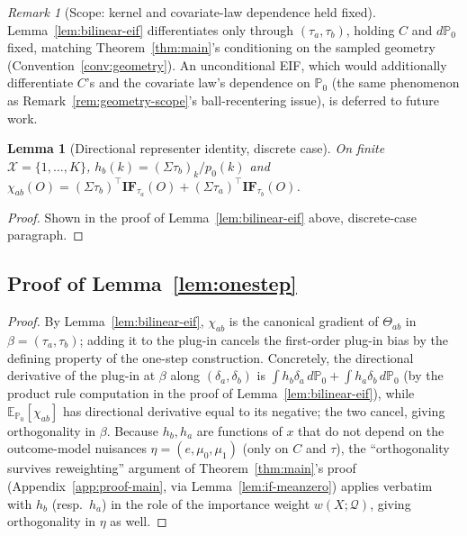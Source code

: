 \documentclass[11pt]{article}
\theoremstyle{plain}
\newtheorem{lemma}[theorem]{Lemma}
\theoremstyle{definition}
\theoremstyle{remark}
\newtheorem{remark}[theorem]{Remark}
\newcommand{\E}{\mathbb{E}}
\newcommand{\PP}{\mathbb{P}}
\newcommand{\cX}{\mathcal{X}}
\newcommand{\Q}{\mathcal{Q}}
\begin{document}
\begin{remark}[Scope: kernel and covariate-law dependence held fixed]\label{rem:kernel-dependence}
Lemma~\ref{lem:bilinear-eif} differentiates only through $(\tau_a,\tau_b)$, holding
$C$ and $d\PP_0$ fixed, matching Theorem~\ref{thm:main}'s conditioning on the sampled
geometry (Convention~\ref{conv:geometry}). An unconditional EIF, which would
additionally differentiate $C$'s and the covariate law's dependence on $\PP_0$ (the
same phenomenon as Remark~\ref{rem:geometry-scope}'s ball-recentering issue), is
deferred to future work.
\end{remark}

\begin{lemma}[Directional representer identity, discrete case]\label{lem:recovery-chi}
On finite $\cX=\{1,\dots,K\}$, $h_b(k)=(\Sigma\tau_b)_k/p_0(k)$ and
$\chi_{ab}(O)=(\Sigma\tau_b)^\top\mathbf{IF}_{\tau_a}(O)+(\Sigma\tau_a)^\top\mathbf{IF}_{\tau_b}(O)$.
\end{lemma}
\begin{proof}
Shown in the proof of Lemma~\ref{lem:bilinear-eif} above, discrete-case paragraph.
\end{proof}

\subsection{Proof of Lemma~\ref{lem:onestep}}\label{app:proof-onestep}

\begin{proof}
By Lemma~\ref{lem:bilinear-eif}, $\chi_{ab}$ is the canonical gradient of $\Theta_{ab}$
in $\beta=(\tau_a,\tau_b)$; adding it to the plug-in cancels the first-order plug-in
bias by the defining property of the one-step construction. Concretely, the
directional derivative of the plug-in at $\beta$ along $(\delta_a,\delta_b)$ is
$\int h_b\delta_a\,d\PP_0+\int h_a\delta_b\,d\PP_0$ (by the product rule computation in
the proof of Lemma~\ref{lem:bilinear-eif}), while $\E_{\PP_0}[\chi_{ab}]$ has
directional derivative equal to its negative; the two cancel, giving orthogonality in
$\beta$. Because $h_b,h_a$ are functions of $x$ that do not depend on the outcome-model
nuisances $\eta=(e,\mu_0,\mu_1)$ (only on $C$ and $\tau$), the ``orthogonality survives
reweighting'' argument of Theorem~\ref{thm:main}'s proof (Appendix~\ref{app:proof-main},
via Lemma~\ref{lem:if-meanzero}) applies verbatim with $h_b$ (resp.\ $h_a$) in the role
of the importance weight $w(X;\Q)$, giving orthogonality in $\eta$ as well.
\end{proof}
\end{document}
